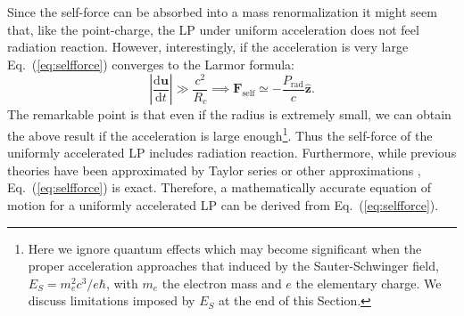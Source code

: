 \documentclass[a4paper,fleqn]{cas-sc}
\begin{document}
Since the self-force can be absorbed into a mass renormalization it might seem that, like the point-charge, the LP under uniform acceleration does not feel radiation reaction. However, interestingly, if the acceleration is very large Eq.~(\ref{eq:selfforce}) converges to the Larmor formula:
\begin{equation}
\left|\displaystyle\frac{\mathrm{d}\mathbf{u}}{\mathrm{d}t}\right|\gg \displaystyle\frac{c^{2}}{R_{c}} \implies \mathbf{F}_{\mathrm{self}} \simeq -\displaystyle\frac{P_{\mathrm{rad}}}{c} \hat{\mathbf{z}}. \label{eq:reaction}
\end{equation}
The remarkable point is that even if the radius is extremely small, we can obtain the above result if the acceleration is large enough\footnote{Here we ignore quantum effects which may become significant when the proper acceleration approaches that induced by the Sauter-Schwinger field, $E_S=m^2_ec^3/e\hbar$, with $m_e$ the electron mass and $e$ the elementary charge. We discuss limitations imposed by $E_S$ at the end of this Section.}. Thus the self-force of the uniformly accelerated LP includes radiation reaction. Furthermore, while previous theories have been approximated by Taylor series or other approximations \cite{Dirac1938,Landau1975}, Eq.~(\ref{eq:selfforce}) is exact. Therefore, a mathematically accurate equation of motion for a uniformly accelerated LP can be derived from Eq.~(\ref{eq:selfforce}).
\end{document}
